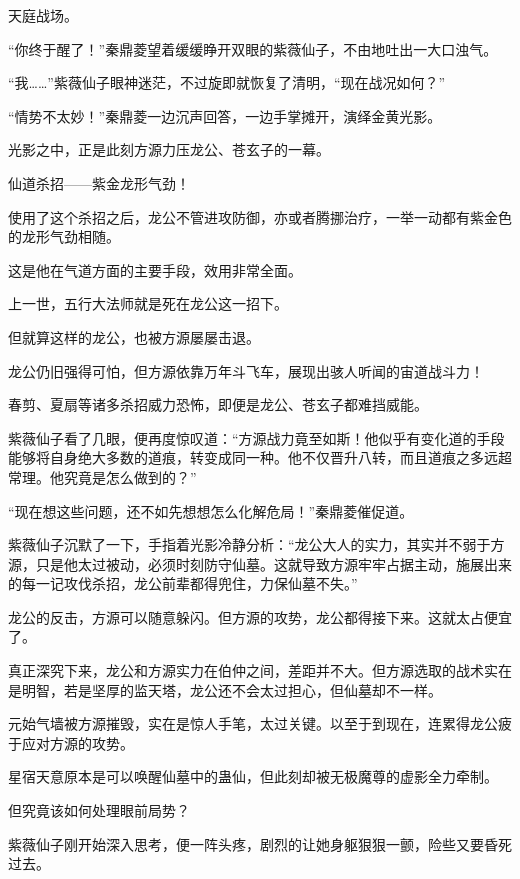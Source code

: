 
\begin{this_body}

天庭战场。

“你终于醒了！”秦鼎菱望着缓缓睁开双眼的紫薇仙子，不由地吐出一大口浊气。

“我……”紫薇仙子眼神迷茫，不过旋即就恢复了清明，“现在战况如何？”

“情势不太妙！”秦鼎菱一边沉声回答，一边手掌摊开，演绎金黄光影。

光影之中，正是此刻方源力压龙公、苍玄子的一幕。

仙道杀招——紫金龙形气劲！

使用了这个杀招之后，龙公不管进攻防御，亦或者腾挪治疗，一举一动都有紫金色的龙形气劲相随。

这是他在气道方面的主要手段，效用非常全面。

上一世，五行大法师就是死在龙公这一招下。

但就算这样的龙公，也被方源屡屡击退。

龙公仍旧强得可怕，但方源依靠万年斗飞车，展现出骇人听闻的宙道战斗力！

春剪、夏扇等诸多杀招威力恐怖，即便是龙公、苍玄子都难挡威能。

紫薇仙子看了几眼，便再度惊叹道：“方源战力竟至如斯！他似乎有变化道的手段能够将自身绝大多数的道痕，转变成同一种。他不仅晋升八转，而且道痕之多远超常理。他究竟是怎么做到的？”

“现在想这些问题，还不如先想想怎么化解危局！”秦鼎菱催促道。

紫薇仙子沉默了一下，手指着光影冷静分析：“龙公大人的实力，其实并不弱于方源，只是他太过被动，必须时刻防守仙墓。这就导致方源牢牢占据主动，施展出来的每一记攻伐杀招，龙公前辈都得兜住，力保仙墓不失。”

龙公的反击，方源可以随意躲闪。但方源的攻势，龙公都得接下来。这就太占便宜了。

真正深究下来，龙公和方源实力在伯仲之间，差距并不大。但方源选取的战术实在是明智，若是坚厚的监天塔，龙公还不会太过担心，但仙墓却不一样。

元始气墙被方源摧毁，实在是惊人手笔，太过关键。以至于到现在，连累得龙公疲于应对方源的攻势。

星宿天意原本是可以唤醒仙墓中的蛊仙，但此刻却被无极魔尊的虚影全力牵制。

但究竟该如何处理眼前局势？

紫薇仙子刚开始深入思考，便一阵头疼，剧烈的让她身躯狠狠一颤，险些又要昏死过去。


\end{this_body}
